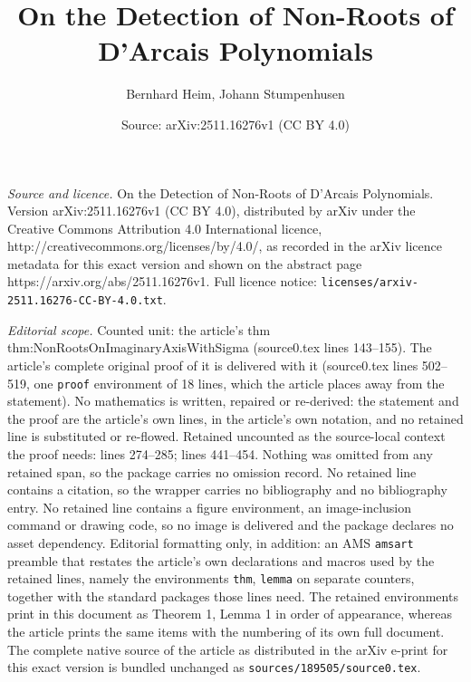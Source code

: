 \documentclass[10pt,a4paper]{amsart}
\title{On the Detection of Non-Roots of D'Arcais Polynomials}
\author{Bernhard Heim, Johann Stumpenhusen}
\date{Source: arXiv:2511.16276v1 (CC BY 4.0)}
\begin{document}
\maketitle

\noindent\emph{Source and licence.} On the Detection of Non-Roots of D'Arcais Polynomials. Version arXiv:2511.16276v1 (CC BY 4.0), distributed by arXiv under the Creative Commons Attribution 4.0 International licence, http://creativecommons.org/licenses/by/4.0/, as recorded in the arXiv licence metadata for this exact version and shown on the abstract page https://arxiv.org/abs/2511.16276v1. Full licence notice: \texttt{licenses/arxiv-2511.16276-CC-BY-4.0.txt}.\par\smallskip

\noindent\textit{Editorial scope.} Counted unit: the article's thm thm:NonRootsOnImaginaryAxisWithSigma (source0.tex lines 143--155). The article's complete original proof of it is delivered with it (source0.tex lines 502--519, one \texttt{proof} environment of 18 lines, which the article places away from the statement). No mathematics is written, repaired or re-derived: the statement and the proof are the article's own lines, in the article's own notation, and no retained line is substituted or re-flowed.  Retained uncounted as the source-local context the proof needs: lines 274--285; lines 441--454.  Nothing was omitted from any retained span, so the package carries no omission record.  No retained line contains a citation, so the wrapper carries no bibliography and no bibliography entry.  No retained line contains a figure environment, an image-inclusion command or drawing code, so no image is delivered and the package declares no asset dependency.  Editorial formatting only, in addition: an AMS \texttt{amsart} preamble that restates the article's own declarations and macros used by the retained lines, namely the environments \texttt{thm}, \texttt{lemma} on separate counters, together with the standard packages those lines need.  The retained environments print in this document as Theorem 1, Lemma 1 in order of appearance, whereas the article prints the same items with the numbering of its own full document.  The complete native source of the article as distributed in the arXiv e-print for this exact version is bundled unchanged as \texttt{sources/189505/source0.tex}.
\end{document}
